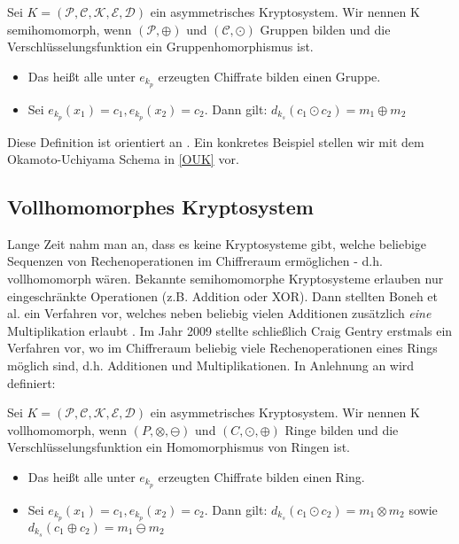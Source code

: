 \begin{theorem}
	\label{PKS}
	Sei $K = (\mathcal{P},\mathcal{C},\mathcal{K},\mathcal{E},\mathcal{D})$ ein asymmetrisches Kryptosystem. Wir nennen K semihomomorph, wenn $(\mathcal{P},\oplus)$ und $(\mathcal{C},\odot)$ Gruppen bilden und die Verschlüsselungsfunktion ein Gruppenhomorphismus ist. 
	\begin{itemize}
		\item Das heißt alle unter $e_{k_p}$ erzeugten Chiffrate bilden einen Gruppe.
		\item Sei $e_{k_p}(x_1)=c_1,e_{k_p}(x_2)=c_2$. Dann gilt: $d_{k_s}(c_1\odot c_2)= m_1\oplus m_2$
	\end{itemize}
\end{theorem}

Diese Definition ist orientiert an \cite[p.499]{katz2014introduction}. Ein konkretes Beispiel stellen wir mit dem Okamoto-Uchiyama Schema in \ref{OUK} vor.

\subsection{Vollhomomorphes Kryptosystem}
\label{VHKK}

Lange Zeit nahm man an, dass es keine Kryptosysteme gibt, welche beliebige Sequenzen von Rechenoperationen im Chiffreraum ermöglichen - d.h. vollhomomorph wären. Bekannte semihomomorphe Kryptosysteme erlauben nur eingeschränkte Operationen (z.B. Addition oder XOR). Dann stellten Boneh et al. ein Verfahren vor, welches neben beliebig vielen Additionen zusätzlich \textit{eine} Multiplikation erlaubt \cite[p.2]{boneh2005evaluating}. Im Jahr 2009 stellte schließlich Craig Gentry \cite{gentry2009fully} erstmals ein Verfahren vor, wo im Chiffreraum beliebig viele Rechenoperationen eines Rings möglich sind, d.h. Additionen und Multiplikationen. In Anlehnung an \cite[p.48]{yi2014homomorphic} wird definiert:

\begin{theorem}
	\label{PKS}
	Sei $K = (\mathcal{P},\mathcal{C},\mathcal{K},\mathcal{E},\mathcal{D})$ ein asymmetrisches Kryptosystem. Wir nennen K vollhomomorph, wenn $(P,\otimes,\ominus)$ und $(C,\odot,\oplus)$ Ringe bilden und die Verschlüsselungsfunktion ein Homomorphismus von Ringen ist. 
	\begin{itemize}
		\item Das heißt alle unter $e_{k_p}$ erzeugten Chiffrate bilden einen Ring.
		\item Sei $e_{k_p}(x_1)=c_1,e_{k_p}(x_2)=c_2$. Dann gilt: $d_{k_s}(c_1\odot c_2)= m_1\otimes m_2$ sowie $d_{k_s}(c_1\oplus c_2)= m_1\ominus m_2$
	\end{itemize}
\end{theorem}


